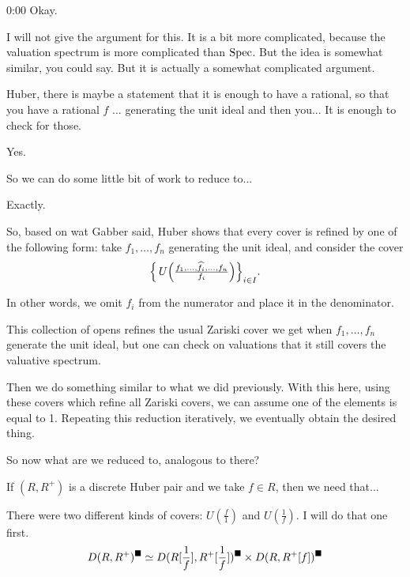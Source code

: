\begin{unfinished}{0:00}
\answer Okay.

I will not give the argument for this. It is a bit more complicated, because the valuation spectrum is more complicated than $\operatorname{Spec}$. But the idea is somewhat similar, you could say. But it is actually a somewhat complicated argument. 

\gabber Huber, there is maybe a statement that it is enough to have a rational, so that you have a rational $f$ ... generating the unit ideal and then you... It is enough to check for those.


\answer Yes.

\gabber So we can do some little bit of work to reduce to...

\answer Exactly.

So, based on wat Gabber said, Huber shows that every cover is refined by one of the following form: take $f_1, \ldots, f_n$ generating the unit ideal, and consider the cover
\[
\Bigl\{\, U\!\left(\tfrac{f_1, \ldots, \widehat{f_i}, \ldots, f_n}{f_i}\right) \Bigr\}_{i \in I}.
\]

In other words, we omit $f_i$ from the numerator and place it in the denominator. 

This collection of opens refines the usual Zariski cover we get when $f_1, \ldots, f_n$ generate the unit ideal, but one can check on valuations that it still covers the valuative spectrum. 

Then we do something similar to what we did previously. With this  here, using these covers which refine all Zariski covers, we can assume one of the elements is equal to 1. Repeating this reduction iteratively, we eventually obtain the desired thing.

So now what are we reduced to, analogous to there? 


If $(R, R^+)$ is a discrete Huber pair and we take $f \in R$, then we need that...

There were two different kinds of covers: $U(\frac{f}{1})$ and $U(\frac{1}{f})$.
I will do that one  first. 
\[
D(R, R^+)^\blacksquare \simeq D(R[\frac{1}{f}], R^+[\frac{1}{f}])^\blacksquare \times D(R,R^+[f])^\blacksquare
\]



\end{unfinished}
